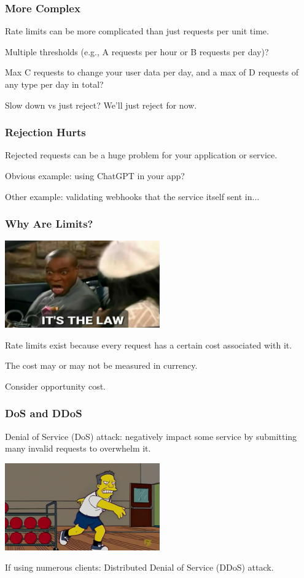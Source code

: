 \begin{frame}
\frametitle{More Complex}

Rate limits can be more complicated than just requests per unit time. 

Multiple thresholds (e.g., A requests per hour or B requests per day)?

Max C requests to change your user data per day, and a max of D requests of any type per day in total?

Slow down vs just reject? We'll just reject for now.

\end{frame}

\begin{frame}
\frametitle{Rejection Hurts}

Rejected requests can be a huge problem for your application or service.

Obvious example: using ChatGPT in your app?

Other example: validating webhooks that the service itself sent in...

\end{frame}

\begin{frame}
\frametitle{Why Are Limits?}

\begin{center}
  \includegraphics[width=0.5\textwidth]{images/its-the-law.jpg}
\end{center}

Rate limits exist because every request has a certain cost associated with it.

The cost may or may not be measured in currency.

Consider opportunity cost.

\end{frame}

\begin{frame}
\frametitle{DoS and DDoS}
\alert{Denial of Service (DoS)} attack: negatively impact some service by submitting many invalid requests to overwhelm it.

\begin{center}
  \includegraphics[width=0.5\textwidth]{images/bombardment.jpg}
\end{center}

If using numerous clients: \alert{Distributed Denial of Service (DDoS)} attack. 

\end{frame}

